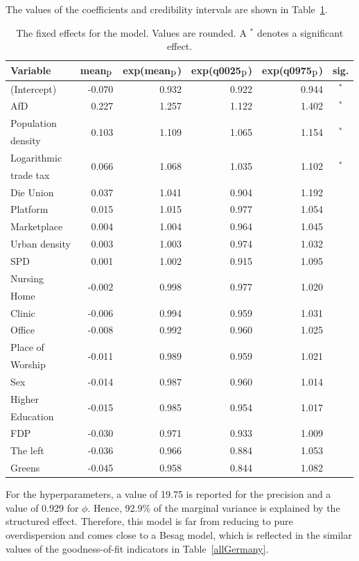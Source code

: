 The values of the coefficients and credibility intervals are shown in Table~\ref{FixedAllGermany_spatial}.
\begin{table}[H]
\caption{The fixed effects for the model. Values are rounded. A $^*$ denotes a significant effect. \label{FixedAllGermany_spatial}}
\begin{tabular}{l r r r r c}
\toprule
\textbf{Variable}	& \textbf{mean$_{\hbox{p}}$}	& \textbf{exp(mean$_{\hbox{p}}$)} & \textbf{exp(q0025$_{\hbox{p}}$)} & \textbf{exp(q0975$_{\hbox{p}}$)} & \textbf{sig.}\\
\midrule
(Intercept) & -0.070 & 0.932 & 0.922 & 0.944 & $^*$\\
AfD & 0.227 & 1.257 & 1.122 & 1.402 & $^*$\\
Population & \multirow{2}{*}{0.103} & \multirow{2}{*}{1.109} & \multirow{2}{*}{1.065} & \multirow{2}{*}{1.154} & \multirow{2}{*}{$^*$}\\
density \\
Logarithmic & \multirow{2}{*}{0.066} & \multirow{2}{*}{1.068} & \multirow{2}{*}{1.035} & \multirow{2}{*}{1.102} & \multirow{2}{*}{$^*$}\\
trade tax \\
Die Union & 0.037 & 1.041 & 0.904 & 1.192\\
Platform & 0.015 & 1.015 & 0.977 & 1.054 \\
Marketplace & 0.004 & 1.004 & 0.964 & 1.045 \\
Urban density & 0.003 & 1.003 & 0.974 & 1.032 \\
SPD & 0.001 & 1.002 & 0.915 & 1.095\\
Nursing& \multirow{2}{*}{-0.002} & \multirow{2}{*}{0.998} & \multirow{2}{*}{0.977} & \multirow{2}{*}{1.020} \\
Home\\
Clinic & -0.006 & 0.994 & 0.959 & 1.031 \\
Office & -0.008 & 0.992 & 0.960 & 1.025 \\
Place of & \multirow{2}{*}{-0.011} & \multirow{2}{*}{0.989} & \multirow{2}{*}{0.959} & \multirow{2}{*}{1.021} \\
Worship\\
Sex & -0.014 & 0.987 & 0.960 & 1.014 & \\
Higher & \multirow{2}{*}{-0.015} & \multirow{2}{*}{0.985} & \multirow{2}{*}{0.954} & \multirow{2}{*}{1.017} \\
Education\\
FDP & -0.030 & 0.971 & 0.933& 1.009 \\
The left & -0.036 & 0.966 & 0.884 & 1.053\\
Greens & -0.045 & 0.958 & 0.844 & 1.082 \\
\bottomrule
\end{tabular}
\end{table}
For the hyperparameters, a value of 19.75 is reported for the precision and a value of 0.929 for $\phi$. Hence, 92.9\% of the marginal variance is explained by the structured effect. Therefore, this model is far from reducing to pure overdispersion and comes close to a Besag model, which is reflected in the similar values of the goodness-of-fit indicators in Table~\ref{allGermany}.

